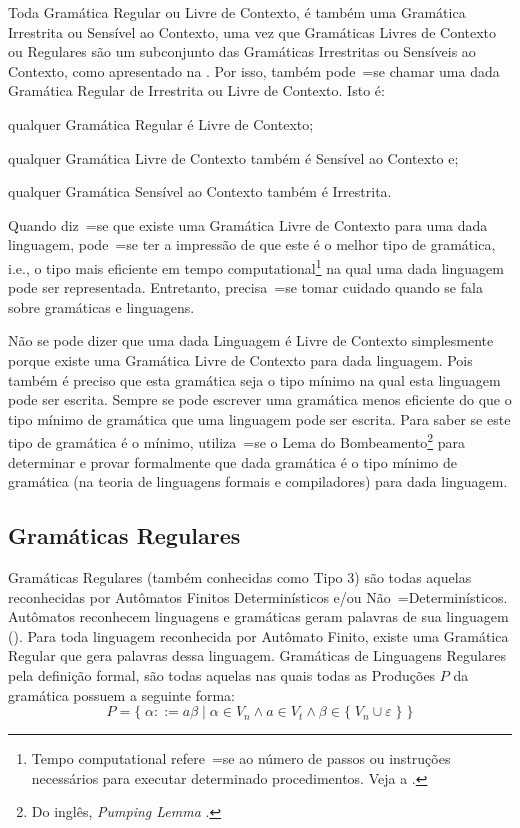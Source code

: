 Toda Gramática Regular ou
Livre de Contexto,
é também uma Gramática Irrestrita ou
Sensível ao Contexto,
uma vez que Gramáticas Livres de Contexto ou
Regulares são um subconjunto das Gramáticas Irrestritas ou
Sensíveis ao Contexto,
como apresentado na .
Por isso,
também pode~=se chamar uma dada Gramática Regular de Irrestrita ou
Livre de Contexto.
Isto é:
\begin{inparaenum}[1)]
\item qualquer Gramática Regular é Livre de Contexto;
\item qualquer Gramática Livre de Contexto também é Sensível ao Contexto e;
\item qualquer Gramática Sensível ao Contexto também é Irrestrita.
\end{inparaenum}%

Quando diz~=se que existe uma Gramática Livre de Contexto para uma dada linguagem,
pode~=se ter a impressão de que este é o melhor tipo de gramática,
i.e.,
o tipo mais eficiente em tempo computational\footnote{
Tempo computational refere~=se ao número de passos ou
instruções necessários para executar determinado procedimentos.
Veja a .
} na qual uma dada linguagem pode ser representada.
Entretanto,
precisa~=se tomar cuidado quando se fala sobre gramáticas e
linguagens.

Não se pode dizer que uma dada Linguagem é Livre de Contexto simplesmente porque existe uma Gramática Livre de Contexto para dada linguagem.
Pois também é preciso que esta gramática seja o tipo mínimo na qual esta linguagem pode ser escrita.
Sempre se pode escrever uma gramática menos eficiente do que o tipo mínimo de gramática que uma linguagem pode ser escrita.
Para saber se este tipo de gramática é o mínimo,
utiliza~=se o Lema do Bombeamento\footnote{
Do inglês,
\textit{Pumping Lemma} \cite{hopcroftBook,sipserBook}.
}
para determinar e
provar formalmente que dada gramática é o tipo mínimo de gramática (na teoria de linguagens formais e
compiladores) para dada linguagem.


\subsection{Gramáticas Regulares}

Gramáticas Regulares (também conhecidas como Tipo 3) são todas aquelas reconhecidas por Autômatos Finitos Determinísticos e\slash{}ou Não~=Determinísticos.
Autômatos reconhecem linguagens e
gramáticas geram palavras de sua linguagem ().
Para toda linguagem reconhecida por Autômato Finito,
existe uma Gramática Regular que gera palavras dessa linguagem.
Gramáticas de Linguagens Regulares pela definição formal,
são todas aquelas nas quais todas as Produções $P$ da gramática possuem a seguinte forma:
$$ P = \{\; \alpha ::= a \beta \;|\; \alpha \in V_n \land a \in V_t
            \land \beta \in \{\; V_n \cup \varepsilon\; \} \;\} $$

